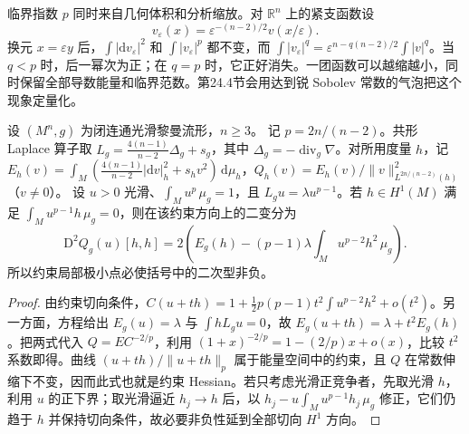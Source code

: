 \ProseParagraphBreak
临界指数 \(p\) 同时来自几何体积和分析缩放。对 \(\mathbb R^n\) 上的紧支函数设
\[
	v_\varepsilon(x)=\varepsilon^{-(n-2)/2}v(x/\varepsilon).
\]
换元 \(x=\varepsilon y\) 后，\(\int|\mathrm dv_\varepsilon|^2\) 和 \(\int|v_\varepsilon|^p\) 都不变，而 \(\int|v_\varepsilon|^q=\varepsilon^{n-q(n-2)/2}\int|v|^q\)。当 \(q<p\) 时，后一幂次为正；在 \(q=p\) 时，它正好消失。一团函数可以越缩越小，同时保留全部导数能量和临界范数。第24.4节会用达到锐 Sobolev 常数的气泡把这个现象定量化。

\begin{proposition}\label{g3:prop:yamabe-second-variation}
	设 \((M^n,g)\) 为闭连通光滑黎曼流形，\(n\ge3\)。
	记 \(p=2n/(n-2)\)。共形 Laplace 算子取 \(L_g=\tfrac{4(n-1)}{n-2}\Delta_g+s_g\)，其中 \(\Delta_g=-\operatorname{div}_g\nabla\)。对所用度量 \(h\)，记 \(E_h(v)=\int_M(\tfrac{4(n-1)}{n-2}|\mathrm dv|_h^2+s_hv^2)\,\mathrm d\mu_h\)，\(Q_h(v)=E_h(v)/\|v\|_{L^{2n/(n-2)}(h)}^2\)（\(v\ne0\)）。
	设 \(u>0\) 光滑、\(\int_Mu^p\,\mu_g=1\)，且 \(L_gu=\lambda u^{p-1}\)。若 \(h\in H^1(M)\) 满足 \(\int_Mu^{p-1}h\,\mu_g=0\)，则在该约束方向上的二变分为
	\begin{equation}\label{g3:eq:yamabe-second-variation}
		\mathrm D^2Q_g(u)[h,h]
		=2\left(E_g(h)-(p-1)\lambda\int_Mu^{p-2}h^2\,\mu_g\right).
	\end{equation}
	所以约束局部极小点必使括号中的二次型非负。
\end{proposition}
\begin{proof}
	由约束切向条件，\(C(u+th)=1+\tfrac12p(p-1)t^2\int u^{p-2}h^2+o(t^2)\)。另一方面，方程给出 \(E_g(u)=\lambda\) 与 \(\int hL_gu=0\)，故 \(E_g(u+th)=\lambda+t^2E_g(h)\)。把两式代入 \(Q=E C^{-2/p}\)，利用 \((1+x)^{-2/p}=1-(2/p)x+o(x)\)，比较 \(t^2\) 系数即得。曲线 \((u+th)/\|u+th\|_p\) 属于能量空间中的约束，且 \(Q\) 在常数伸缩下不变，因而此式也就是约束 Hessian。若只考虑光滑正竞争者，先取光滑 \(h\)，利用 \(u\) 的正下界；取光滑逼近 \(h_j\to h\) 后，以 \(h_j-u\int_Mu^{p-1}h_j\,\mu_g\) 修正，它们仍趋于 \(h\) 并保持切向条件，故必要非负性延到全部切向 \(H^1\) 方向。
\end{proof}

